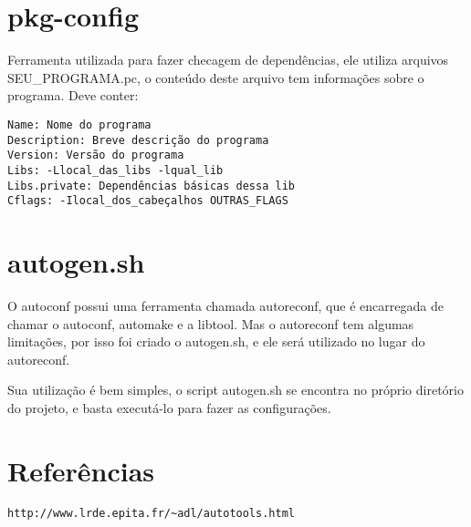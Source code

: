 \documentclass[]{article}
\begin{document}
\section{pkg-config}
Ferramenta utilizada para fazer checagem de dependências, ele utiliza arquivos SEU\_PROGRAMA.pc, o conteúdo deste arquivo tem informações sobre o programa.
Deve conter:
\begin{verbatim}
Name: Nome do programa
Description: Breve descrição do programa
Version: Versão do programa
Libs: -Llocal_das_libs -lqual_lib
Libs.private: Dependências básicas dessa lib
Cflags: -Ilocal_dos_cabeçalhos OUTRAS_FLAGS
\end{verbatim}

\section{autogen.sh}
O autoconf possui uma ferramenta chamada autoreconf, que é encarregada de chamar o autoconf, automake e a libtool.
Mas o autoreconf tem algumas limitações, por isso foi criado o autogen.sh, e ele será utilizado no lugar do autoreconf.

Sua utilização é bem simples, o script autogen.sh se encontra no próprio diretório do projeto, e basta executá-lo para fazer as configurações.

\section{Referências}
\begin{verbatim}
http://www.lrde.epita.fr/~adl/autotools.html
\end{verbatim}
\end{document}
